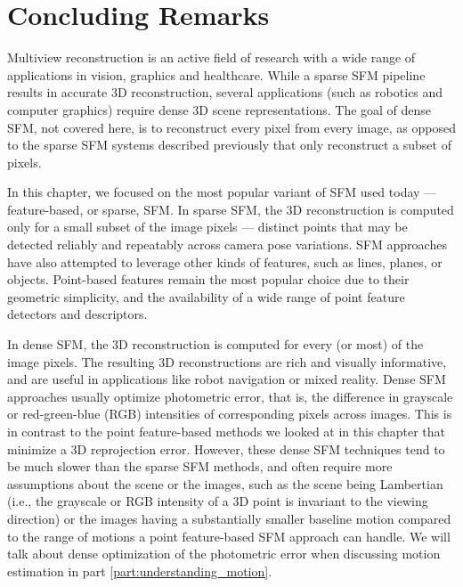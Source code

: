 \section{Concluding Remarks}

Multiview reconstruction is an active field of research with a wide range of applications in vision, graphics and healthcare. 
While a sparse SFM pipeline results in accurate 3D reconstruction, several applications (such as robotics and computer graphics) require dense 3D scene representations. The goal of dense SFM, not covered here, is to reconstruct every pixel from every image, as opposed to the sparse SFM systems described previously that only reconstruct a subset of pixels.
 
In this chapter, we focused on the most popular variant of SFM used today --- feature-based, or sparse, SFM. In sparse SFM, the 3D reconstruction is computed only for a small subset of the image pixels --- distinct points that may be detected reliably and repeatably across camera pose variations. SFM approaches have also attempted to leverage other kinds of features, such as lines, planes, or objects. Point-based features remain the most popular choice due to their geometric simplicity, and the availability of a wide range of point feature detectors and descriptors.

In dense SFM, the 3D reconstruction is computed for every (or most) of the image pixels. The resulting 3D reconstructions are rich and visually informative, and are useful in applications like robot navigation or mixed reality. Dense SFM approaches usually optimize photometric error, that is, the difference in grayscale or red-green-blue (RGB) intensities of corresponding pixels across images. This is in contrast to the point feature-based methods we looked at in this chapter that minimize a 3D reprojection error. However, these dense SFM techniques tend to be much slower than the sparse SFM methods, and often require more assumptions about the scene or the images, such as the scene being Lambertian (i.e., the grayscale or RGB intensity of a 3D point is invariant to the viewing direction) or the images having a substantially smaller baseline motion compared to the range of motions a point feature-based SFM approach can handle. We will talk about dense optimization of the photometric error when discussing motion estimation in part \ref{part:understanding_motion}.

